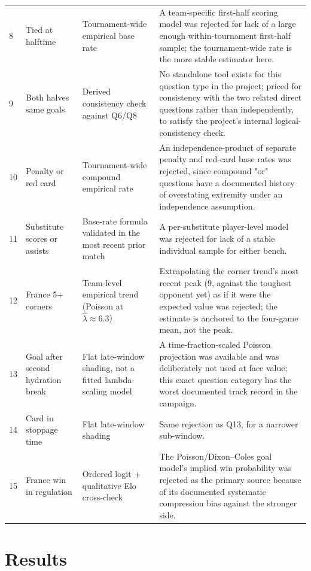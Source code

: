 \documentclass[11pt]{article}
\begin{document}
\begin{longtable}{p{1.6cm}p{4.6cm}p{3.0cm}p{5.0cm}}
8 & Tied at halftime & Tournament-wide empirical base rate & A team-specific first-half scoring model was rejected for lack of a large enough within-tournament first-half sample; the tournament-wide rate is the more stable estimator here. \\
9 & Both halves same goals & Derived consistency check against Q6/Q8 & No standalone tool exists for this question type in the project; priced for consistency with the two related direct questions rather than independently, to satisfy the project's internal logical-consistency check. \\
10 & Penalty or red card & Tournament-wide compound empirical rate & An independence-product of separate penalty and red-card base rates was rejected, since compound "or" questions have a documented history of overstating extremity under an independence assumption. \\
11 & Substitute scores or assists & Base-rate formula validated in the most recent prior match & A per-substitute player-level model was rejected for lack of a stable individual sample for either bench. \\
12 & France 5+ corners & Team-level empirical trend (Poisson at $\hat\lambda \approx 6.3$) & Extrapolating the corner trend's most recent peak (9, against the toughest opponent yet) as if it were the expected value was rejected; the estimate is anchored to the four-game mean, not the peak. \\
13 & Goal after second hydration break & Flat late-window shading, not a fitted lambda-scaling model & A time-fraction-scaled Poisson projection was available and was deliberately not used at face value; this exact question category has the worst documented track record in the campaign. \\
14 & Card in stoppage time & Flat late-window shading & Same rejection as Q13, for a narrower sub-window. \\
15 & France win in regulation & Ordered logit + qualitative Elo cross-check & The Poisson/Dixon--Coles goal model's implied win probability was rejected as the primary source because of its documented systematic compression bias against the stronger side. \\
\bottomrule
\end{longtable}

\section{Results}
\label{sec:results}
\end{document}

